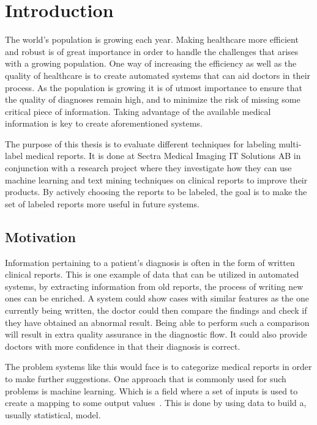 \chapter{Introduction}
\label{cha:introduction}

The world's population is growing each year. 
Making healthcare more efficient and robust is of great importance in order to handle the challenges that arises with a growing population.
One way of increasing the efficiency as well as the quality of healthcare is to create automated systems that can aid doctors in their process.
As the population is growing it is of utmost importance to ensure that the quality of diagnoses remain high, and to minimize the risk of missing some critical piece of information.
Taking advantage of the available medical information is key to create aforementioned systems.

The purpose of this thesis is to evaluate different techniques for labeling multi-label medical reports.
It is done at Sectra Medical Imaging IT Solutions AB in conjunction with a research project where they investigate how they can use machine learning and text mining techniques on clinical reports to improve their products.
By actively choosing the reports to be labeled, the goal is to make the set of labeled reports more useful in future systems.

\section{Motivation}
\label{sec:motivation}

Information pertaining to a patient's diagnosis is often in the form of written clinical reports.
This is one example of data that can be utilized in automated systems, by extracting information from old reports, the process of writing new ones can be enriched.
A system could show cases with similar features as the one currently being written, the doctor could then compare the findings and check if they have obtained an abnormal result.
Being able to perform such a comparison will result in extra quality assurance in the diagnostic flow.
It could also provide doctors with more confidence in that their diagnosis is correct.

The problem systems like this would face is to categorize medical reports in order to make further suggestions.
One approach that is commonly used for such problems is machine learning.
Which is a field where a set of inputs is used to create a mapping to some output values~\cite{bishop2006pattern}.
This is done by using data to build a, usually statistical, model.

